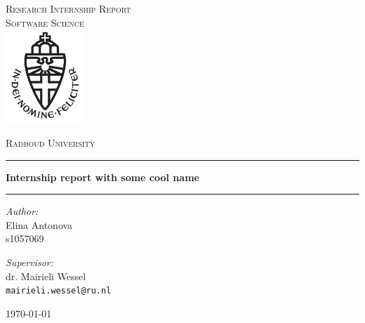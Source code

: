 \documentclass[11pt,a4paper]{report}
\begin{document}
\begin{titlepage}
\begin{center}
\textsc{\LARGE Research Internship Report\\Software Science}\\[1.5cm]
\includegraphics[height=100pt]{logo}

\vspace{0.4cm}
\textsc{\Large Radboud University}\\[1cm]
\hrule
\vspace{0.4cm}
\textbf{\huge Internship report with some cool name}\\[0.4cm]
\hrule
\vspace{2cm}
\begin{minipage}[t]{0.45\textwidth}
\begin{flushleft} \large
\textit{Author:}\\
Elina Antonova\\
s1057069
\end{flushleft}
\end{minipage}
\begin{minipage}[t]{0.45\textwidth}
\begin{flushright} \large
\textit{Supervisor:}\\
dr. Mairieli Wessel \\
\texttt{mairieli.wessel@ru.nl}\\[1.3cm]
\end{flushright}
\end{minipage}
\vfill
{\large \today}
\end{center}
\end{titlepage}



\tableofcontents











\printglossary



\appendix

\end{document}

